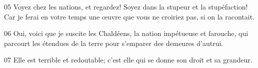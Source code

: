 
05 Voyez chez les nations, et regardez! Soyez dans la stupeur et la stupéfaction! Car je ferai en votre temps une œuvre que vous ne croiriez pas, si on la racontait.

06 Oui, voici que je suscite les Chaldéens, la nation impétueuse et farouche, qui parcourt les étendues de la terre pour s’emparer des demeures d’autrui.

07 Elle est terrible et redoutable; c’est elle qui se donne son droit et sa grandeur.
